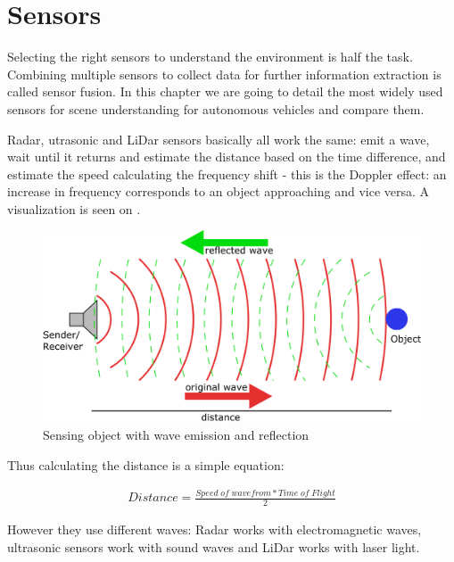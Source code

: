 \chapter{Sensors}
\label{chap:sensors}

Selecting the right sensors to understand the environment is half the task.
Combining multiple sensors to collect data for further information extraction is
called sensor fusion. In this chapter we are going to detail the most widely
used sensors for scene understanding for autonomous vehicles and compare them. 

Radar, utrasonic and LiDar sensors basically all work the same: emit a wave,
wait until it returns and estimate the distance based on the time difference,
and estimate the speed calculating the frequency shift - this is the Doppler
effect: an increase in frequency corresponds to an object approaching and vice
versa. A visualization is seen on .

\begin{figure}[!ht]
    \centering
    \includegraphics[width=150mm, keepaspectratio]{figures/sensors.png}
    \caption{Sensing object with wave emission and reflection}
    \label{fig:sensors}
\end{figure}

Thus calculating the distance is a simple equation:

\begin{align}
Distance=\frac{Speed\; of\; wavefrom * Time\; of\; Flight}{2}
\end{align}

However they use different waves: Radar works with electromagnetic waves,
ultrasonic sensors work with sound waves and LiDar works with laser light.

